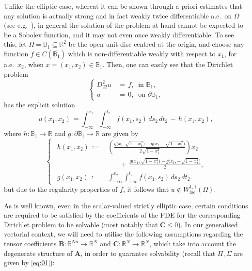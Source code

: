 \documentclass{amsart}
\numberwithin{equation}{section}
\numberwithin{thm}{section}
\theoremstyle{definition}
\def\R{\mathbb{R}}
\def\Om{\Omega}
\def\p{\mathrm{p}}
\renewcommand{\:}{\!:\!} %
\newcommand{\Si}{\Sigma}
\newcommand{\larrow}{\longrightarrow}
\renewcommand{\p}{\partial}
\newcommand{\sub}{\subseteq}
\renewcommand{\^}[1]{^{#1}_{\phantom{l}}}
\begin{document}
Unlike the elliptic case, whereat it can be shown through a priori estimates that any solution is actually strong and in fact weakly twice differentiable a.e.\ on $\Omega$ (see e.g.\ \cite{GM}), in general the solution of the problem at hand cannot be expected to be a Sobolev function, and it may not even once weakly differentiable. To see this, let $\Om=\mathbb B_1\sub \R^2$ be the open unit disc centred at the origin, and choose any function $f\in C(\overline{\mathbb B_1})$ which is non-differentiable weakly with respect to $x_1$, for a.e.\ $x_2$, when $x=(x_1,x_2) \in \mathbb B_1$. Then, one can easily see that the Dirichlet problem
\[
\left\{
\begin{split}
D^2_{22}u \, &=\, f , \ \text{ in }\mathbb B_1,\\
u\,&=\, 0, \ \text{ on }\p\mathbb B_1,
\end{split}
\right.
\]
has the explicit solution
\[
u(x_1,x_2)\, = \int_{-\infty}^{x_2}\int_{-\infty}^{t_2}f(x_1,s_2)\,ds_2\,dt_2 \, -\, h(x_1,x_2),
\]
where $h : \overline{\mathbb B_1} \larrow \R $ and $g : \partial  {\mathbb B_1} \larrow \R$ are given by
\[
\left\{\ \ 
\begin{split}
h(x_1,x_2)\, :=\, &\left(\frac{g\big(x_1, \sqrt{1-x_1^2} \big) - g\big(x_1, -\sqrt{1-x_1^2} \big) } {2\sqrt{1-x_1^2}} \right)x_2\\
&\ \ \ \ \ \ \ \ +\, \frac{g\big(x_1, \sqrt{1-x_1^2} \big) + g\big(x_1, -\sqrt{1-x_1^2} \big) } {2} ,
\\
g(x_1,x_2)\, :=\, &\int_{-\infty}^{x_2}\int_{-\infty}^{t_2}f(x_1,s_2)\,ds_2\,dt_2.
\end{split}
\right.
\]
but due to the regularity properties of $f$, it follows that $u\not\in W^{1,1}_\text{loc}(\Om)$.

As is well known, even in the scalar-valued strictly elliptic case, certain conditions are required to be satisfied by the coefficients of the PDE for the corresponding Dirichlet problem to be solvable (most notably that $\mathbf{C}\leq0$). In our generalised vectorial context, we will need to utilise the following assumptions regarding the tensor coefficients $\mathbf{B}: \mathbb{R}^{Nn} \longrightarrow \mathbb{R}^{N}$ and $\mathbf{C}: \mathbb{R}^{N} \longrightarrow \mathbb{R}^{N}$, which take into account the degenerate structure of $\mathbf{A}$, in order to guarantee solvability (recall that $\Pi,\Si$ are given by \eqref{eq:01}):
\end{document}
